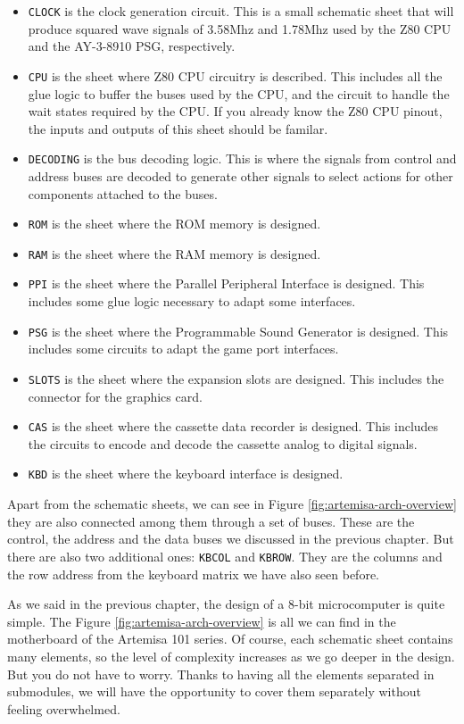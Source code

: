 \begin{itemize}
  \item {\tt CLOCK} is the clock generation circuit. This is a small schematic sheet that will produce squared wave signals of 3.58Mhz and 1.78Mhz used by the Z80 CPU and the AY-3-8910 PSG, respectively.
  \item {\tt CPU} is the sheet where Z80 CPU circuitry is described. This includes all the glue logic to buffer the buses used by the CPU, and the circuit to handle the wait states required by the CPU. If you already know the Z80 CPU pinout, the inputs and outputs of this sheet should be familar.
  \item {\tt DECODING} is the bus decoding logic. This is where the signals from control and address buses are decoded to generate other signals to select actions for other components attached to the buses.
  \item {\tt ROM} is the sheet where the ROM memory is designed.
  \item {\tt RAM} is the sheet where the RAM memory is designed.
  \item {\tt PPI} is the sheet where the Parallel Peripheral Interface is designed. This includes some glue logic necessary to adapt some interfaces.
  \item {\tt PSG} is the sheet where the Programmable Sound Generator is designed. This includes some circuits to adapt the game port interfaces.
  \item {\tt SLOTS} is the sheet where the expansion slots are designed. This includes the connector for the graphics card.
  \item {\tt CAS} is the sheet where the cassette data recorder is designed. This includes the circuits to encode and decode the cassette analog to digital signals.
  \item {\tt KBD} is the sheet where the keyboard interface is designed.
\end{itemize}

Apart from the schematic sheets, we can see in Figure \ref{fig:artemisa-arch-overview} they are also connected among them through a set of buses. These are the control, the address and the data buses we discussed in the previous chapter. But there are also two additional ones: {\tt KBCOL} and {\tt KBROW}. They are the columns and the row address from the keyboard matrix we have also seen before.

As we said in the previous chapter, the design of a 8-bit microcomputer is quite simple. The Figure \ref{fig:artemisa-arch-overview} is all we can find in the motherboard of the Artemisa 101 series. Of course, each schematic sheet contains many elements, so the level of complexity increases as we go deeper in the design. But you do not have to worry. Thanks to having all the elements separated in submodules, we will have the opportunity to cover them separately without feeling overwhelmed.

